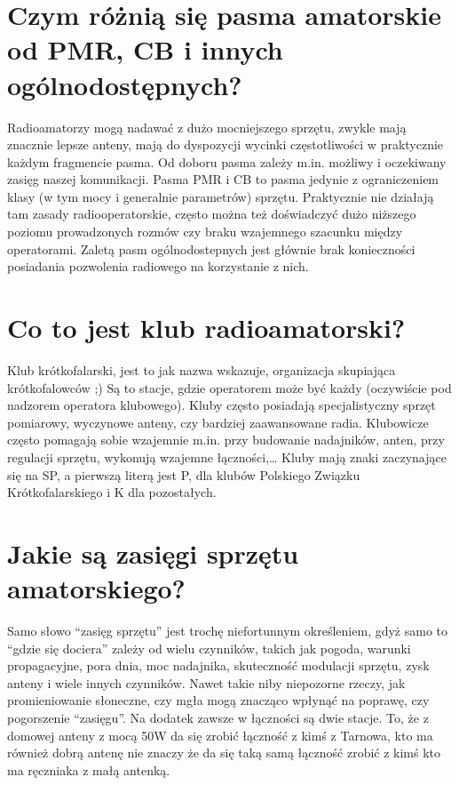 \documentclass[a4paper,12pt]{article}
\begin{document}
\section{Czym różnią się pasma amatorskie od PMR, CB i innych ogólnodostępnych?}
Radioamatorzy mogą nadawać z dużo mocniejszego sprzętu, zwykle mają znacznie lepsze anteny, mają do dyspozycji wycinki częstotliwości w praktycznie każdym fragmencie pasma.
Od doboru pasma zależy m.in. możliwy i oczekiwany zasięg naszej komunikacji. Pasma PMR i CB to pasma jedynie z ograniczeniem klasy (w tym mocy i generalnie parametrów) sprzętu. Praktycznie nie działają tam zasady radiooperatorskie, często można też doświadczyć dużo niższego poziomu prowadzonych rozmów czy braku wzajemnego szacunku między operatorami. Zaletą pasm ogólnodostepnych jest głównie brak konieczności posiadania pozwolenia radiowego na korzystanie z nich.

\section{Co to jest klub radioamatorski?}
Klub krótkofalarski, jest to jak nazwa wskazuje, organizacja skupiająca krótkofalowców ;) Są to stacje, gdzie operatorem może być każdy (oczywiście pod nadzorem operatora klubowego). Kluby często posiadają specjalistyczny sprzęt pomiarowy, wyczynowe anteny, czy bardziej zaawansowane radia. Klubowicze często pomagają sobie wzajemnie m.in. przy budowanie nadajników, anten, przy regulacji sprzętu, wykonują wzajemne łączności,…
Kluby mają znaki zaczynające się na SP, a pierwszą literą jest P, dla klubów Polskiego Związku Krótkofalarskiego i K dla pozostałych.

\section{Jakie są zasięgi sprzętu amatorskiego?}
Samo słowo “zasięg sprzętu” jest trochę niefortunnym określeniem, gdyż samo to “gdzie się dociera” zależy od wielu czynników, takich jak pogoda, warunki propagacyjne, pora dnia, moc nadajnika, skuteczność modulacji sprzętu, zysk anteny i wiele innych czynników. Nawet takie niby niepozorne rzeczy, jak promieniowanie słoneczne, czy mgła mogą znacząco wpłynąć na poprawę, czy pogorszenie “zasięgu”.
Na dodatek zawsze w łączności są dwie stacje. To, że z domowej anteny z mocą 50W da się zrobić łączność z kimś z Tarnowa, kto ma również dobrą antenę nie znaczy że da się taką samą łączność zrobić z kimś kto ma ręczniaka z małą antenką. 
\end{document}
